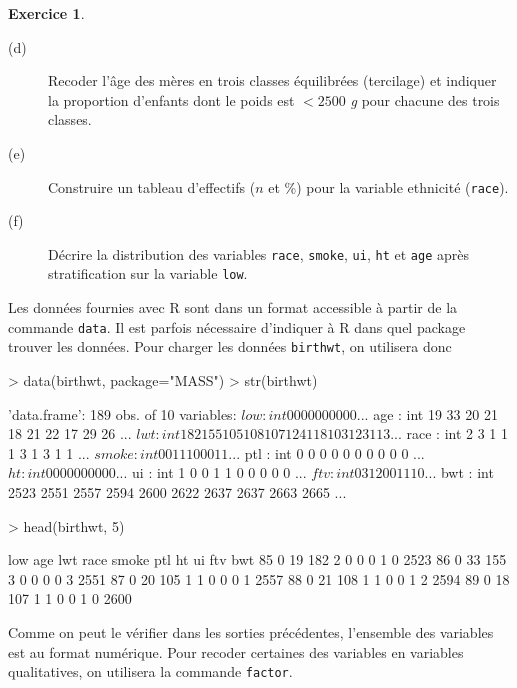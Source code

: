 \documentclass[11pt]{report}
\makeatletter
\theoremstyle{definition}
\newtheorem{exo}{Exercice}[chapter]
\newcommand{\R}{\textsf{R}\xspace}
\newcommand{\foo}[1]{\texttt{#1}}
\newcommand{\cmd}[1]{\index{#1@\foo{#1}}}
\makeatother
\begin{document}
\begin{exo}
\begin{description}
\item[(d)] Recoder l'âge des mères en trois classes équilibrées (tercilage)
  et indiquer la proportion d'enfants dont le poids est $<2500$ \emph{g}
  pour chacune des trois classes.
\item[(e)] Construire un tableau d'effectifs ($n$ et \%) pour la variable
  ethnicité (\texttt{race}).  
\item[(f)] Décrire la distribution des variables \texttt{race},
  \texttt{smoke}, \texttt{ui}, \texttt{ht} et \texttt{age} après
  stratification sur la variable \texttt{low}.  
\end{description}
\begin{sol}
Les données fournies avec \R sont dans un format accessible à partir de la
commande \texttt{data}. Il est parfois nécessaire d'indiquer à \R dans quel
package trouver les données. Pour charger les données \texttt{birthwt}, on
utilisera donc
\begin{Schunk}
\begin{Sinput}
> data(birthwt, package="MASS")
> str(birthwt)
\end{Sinput}
\begin{Soutput}
'data.frame':	189 obs. of  10 variables:
 $ low  : int  0 0 0 0 0 0 0 0 0 0 ...
 $ age  : int  19 33 20 21 18 21 22 17 29 26 ...
 $ lwt  : int  182 155 105 108 107 124 118 103 123 113 ...
 $ race : int  2 3 1 1 1 3 1 3 1 1 ...
 $ smoke: int  0 0 1 1 1 0 0 0 1 1 ...
 $ ptl  : int  0 0 0 0 0 0 0 0 0 0 ...
 $ ht   : int  0 0 0 0 0 0 0 0 0 0 ...
 $ ui   : int  1 0 0 1 1 0 0 0 0 0 ...
 $ ftv  : int  0 3 1 2 0 0 1 1 1 0 ...
 $ bwt  : int  2523 2551 2557 2594 2600 2622 2637 2637 2663 2665 ...
\end{Soutput}
\begin{Sinput}
> head(birthwt, 5)
\end{Sinput}
\begin{Soutput}
   low age lwt race smoke ptl ht ui ftv  bwt
85   0  19 182    2     0   0  0  1   0 2523
86   0  33 155    3     0   0  0  0   3 2551
87   0  20 105    1     1   0  0  0   1 2557
88   0  21 108    1     1   0  0  1   2 2594
89   0  18 107    1     1   0  0  1   0 2600
\end{Soutput}
\end{Schunk}
\cmd{data}\cmd{str}\cmd{head}
Comme on peut le vérifier dans les sorties précédentes, l'ensemble des
variables est au format numérique. Pour recoder certaines des variables en
variables qualitatives, on utilisera la commande \texttt{factor}. 
\begin{Schunk}

\end{Schunk}
\end{sol}
\end{exo}
\end{document}

